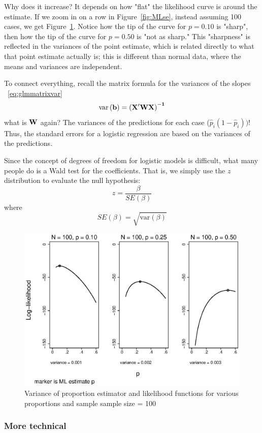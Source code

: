 Why does it increase? It depends on how "flat" the likelihood curve is around the estimate. If we zoom in on a row in Figure~\ref{fig:MLse}, instead assuming 100 cases, we get Figure~\ref{fig:MLsezoom}. Notice how the tip of the curve for $p = 0.10$ is "sharp", then how the tip of the curve for $p = 0.50$ is "not as sharp." This "sharpness" is reflected in the variances of the point estimate, which is related directly to what that point estimate actually is; this is different than normal data, where the means and variances are independent.

To connect everything, recall the matrix formula for the variances of the slopes ~\eqref{eq:glmmatrixvar}
\[
\mbox{var}\left({\bf b}\right) = {\bf{\left(X'WX\right)^{-1}}}
\]
what is ${\bf W}$ again? The variances of the predictions for each case ($\hat{p}_i\left(1-\hat{p}_i\right))$! Thus, the standard errors for a logistic regression are based on the variances of the predictions.

Since the concept of degrees of freedom for logistic models is difficult, what many people do is a Wald test for the coefficients. That is, we simply use the $z$ distribution to evaluate the null hypothesis:
\[
z = \frac{\beta}{SE\left(\beta\right)}
\]
where
\[
SE\left(\beta\right) = \sqrt{\mbox{var}\left(\beta\right)}
\]

\begin{figure}
   \centering
   \includegraphics[angle=0,
           width=.75\textwidth]{MLsezoom.eps}
   \caption{Variance of proportion estimator and likelihood functions for various proportions and sample sample size = 100}
  \label{fig:MLsezoom}
\end{figure}

\subsubsection{More technical}

